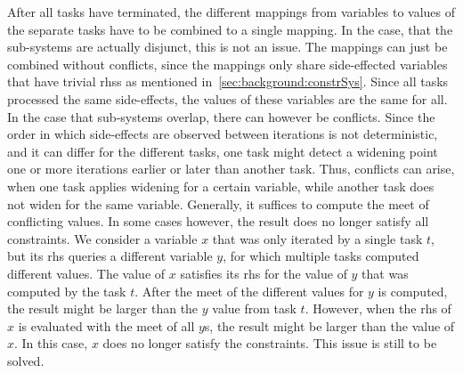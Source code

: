     After all tasks have terminated, the different mappings from variables to values of the separate tasks have to be combined to a single mapping. In the case, that the sub-systems are actually disjunct, this is not an issue. The mappings can just be combined without conflicts, since the mappings only share side-effected variables that have trivial \acp{rhs} as mentioned in~\autoref{sec:background:constrSys}. Since all tasks processed the same side-effects, the values of these variables are the same for all.
    In the case that sub-systems overlap, there can however be conflicts. Since the order in which side-effects are observed between iterations is not deterministic, and it can differ for the different tasks, one task might detect a widening point one or more iterations earlier or later than another task. Thus, conflicts can arise, when one task applies widening for a certain variable, while another task does not widen for the same variable. Generally, it suffices to compute the meet of conflicting values. In some cases however, the result does no longer satisfy all constraints. We consider a variable $x$ that was only iterated by a single task $t$, but its \ac{rhs} queries a different variable $y$, for which multiple tasks computed different values. The value of $x$ satisfies its \ac{rhs} for the value of $y$ that was computed by the task $t$. After the meet of the different values for $y$ is computed, the result might be larger than the $y$ value from task $t$. However, when the \ac{rhs} of $x$ is evaluated with the meet of all $y$s, the result might be larger than the value of $x$. In this case, $x$ does no longer satisfy the constraints. This issue is still to be solved.
